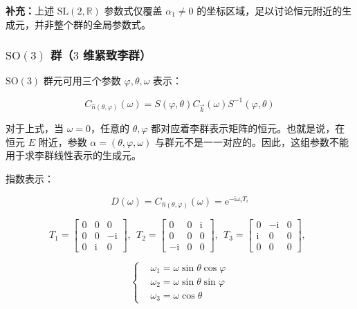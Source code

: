 \textbf{补充：}上述 $\mathrm{SL}\left(2,\mathbb{R}\right)$ 参数式仅覆盖 $\alpha_1\ne0$ 的坐标区域，足以讨论恒元附近的生成元，并非整个群的全局参数式。

\subsubsection*{\texorpdfstring{$\mathrm{SO}\left(3\right)$ 群（$3$ 维紧致李群）}{SO(3) 群（3 维紧致李群）}}

$\mathrm{SO}\left(3\right)$ 群元可用三个参数 $\varphi,\theta,\omega$ 表示：

\begin{equation}
C_{\hat{n}\left(\theta,\varphi\right)}\left(\omega\right)
=S\left(\varphi,\theta\right)C_{\vec{k}}\left(\omega\right)S^{-1}\left(\varphi,\theta\right)
\end{equation}

对于上式，当 $\omega=0$，任意的 $\theta,\varphi$ 都对应着李群表示矩阵的恒元。也就是说，在恒元 $E$ 附近，参数 $\alpha=\left(\theta,\varphi,\omega\right)$ 与群元不是一一对应的。因此，这组参数不能用于求李群线性表示的生成元。

指数表示：

\begin{equation}
D\left(\omega\right)
=C_{\hat{n}\left(\theta,\varphi\right)}\left(\omega\right)
=\mathrm{e}^{-\mathrm{i}\omega_i T_i}
\end{equation}

\begin{equation}
T_1
=\begin{bmatrix}
0 &0 &0 \\
0 &0 &-\mathrm{i} \\
0 &\mathrm{i} &0
\end{bmatrix},~~
T_2
=\begin{bmatrix}
0 &0 &\mathrm{i} \\
0 &0 &0 \\
-\mathrm{i} &0 &0
\end{bmatrix},~~
T_3
=\begin{bmatrix}
0 &-\mathrm{i} &0 \\
\mathrm{i} &0 &0 \\
0 &0 &0
\end{bmatrix},~~
\end{equation}

\begin{equation}
\left\{
\begin{aligned}
&\omega_1 = \omega\sin\theta\cos\varphi \\
&\omega_2 = \omega\sin\theta\sin\varphi \\
&\omega_3 = \omega\cos\theta
\end{aligned}
\right.
\end{equation}

